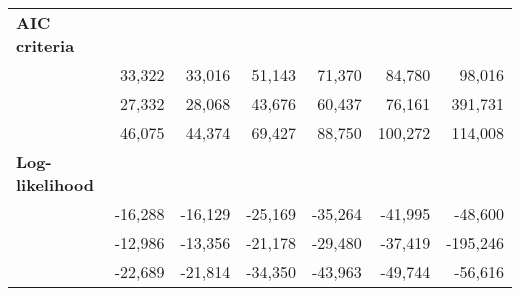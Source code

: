 \begin{tabular}{lllllll}
\multicolumn{1}{l}{\textbf{AIC criteria}} &
  \multicolumn{1}{|r}{} &
  \multicolumn{1}{r}{} &
  \multicolumn{1}{r}{} &
  \multicolumn{1}{r}{} &
  \multicolumn{1}{r}{} &
  \multicolumn{1}{r}{} \\
\multicolumn{1}{l}{\hspace{1em}{Model (A)}} &
  \multicolumn{1}{|r}{33,322} &
  \multicolumn{1}{r}{33,016} &
  \multicolumn{1}{r}{51,143} &
  \multicolumn{1}{r}{71,370} &
  \multicolumn{1}{r}{84,780} &
  \multicolumn{1}{r}{98,016} \\
\multicolumn{1}{l}{\hspace{1em}{Model (B)}} &
  \multicolumn{1}{|r}{27,332} &
  \multicolumn{1}{r}{28,068} &
  \multicolumn{1}{r}{43,676} &
  \multicolumn{1}{r}{60,437} &
  \multicolumn{1}{r}{76,161} &
  \multicolumn{1}{r}{391,731} \\
\multicolumn{1}{l}{\hspace{1em}{Model (C)}} &
  \multicolumn{1}{|r}{46,075} &
  \multicolumn{1}{r}{44,374} &
  \multicolumn{1}{r}{69,427} &
  \multicolumn{1}{r}{88,750} &
  \multicolumn{1}{r}{100,272} &
  \multicolumn{1}{r}{114,008} \\
\multicolumn{1}{l}{\textbf{Log-likelihood}} &
  \multicolumn{1}{|r}{} &
  \multicolumn{1}{r}{} &
  \multicolumn{1}{r}{} &
  \multicolumn{1}{r}{} &
  \multicolumn{1}{r}{} &
  \multicolumn{1}{r}{} \\
\multicolumn{1}{l}{\hspace{1em}{Model (A)}} &
  \multicolumn{1}{|r}{-16,288} &
  \multicolumn{1}{r}{-16,129} &
  \multicolumn{1}{r}{-25,169} &
  \multicolumn{1}{r}{-35,264} &
  \multicolumn{1}{r}{-41,995} &
  \multicolumn{1}{r}{-48,600} \\
\multicolumn{1}{l}{\hspace{1em}{Model (B)}} &
  \multicolumn{1}{|r}{-12,986} &
  \multicolumn{1}{r}{-13,356} &
  \multicolumn{1}{r}{-21,178} &
  \multicolumn{1}{r}{-29,480} &
  \multicolumn{1}{r}{-37,419} &
  \multicolumn{1}{r}{-195,246} \\
\multicolumn{1}{l}{\hspace{1em}{Model (C)}} &
  \multicolumn{1}{|r}{-22,689} &
  \multicolumn{1}{r}{-21,814} &
  \multicolumn{1}{r}{-34,350} &
  \multicolumn{1}{r}{-43,963} &
  \multicolumn{1}{r}{-49,744} &
  \multicolumn{1}{r}{-56,616} \\
\cline{1-7}
\end{tabular}
